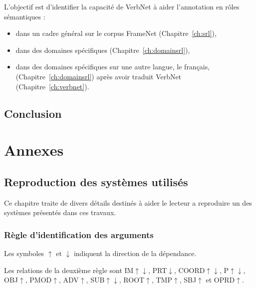 \documentclass[oneside,parskip,draft]{scrbook}
\begin{document}
L'objectif est d'identifier la capacité de VerbNet à aider l'annotation en
rôles sémantiques :
\begin{itemize}
    \item dans un cadre général sur le corpus FrameNet (Chapitre~\ref{ch:srl}),
    \item dans des domaines spécifiques (Chapitre~\ref{ch:domainsrl}),
    \item dans des domaines spécifiques sur une autre langue, le français, (Chapitre~\ref{ch:domainsrl}) après avoir traduit VerbNet (Chapitre~\ref{ch:verbnet}).
\end{itemize}









\chapter{Conclusion}
\label{ch:conc}


\backmatter




\part{Annexes}

\chapter{Reproduction des systèmes utilisés}

Ce chapitre traite de divers détails destinés à aider le lecteur a reproduire
un des systèmes présentés dans ces travaux.

\section{Règle d'identification des arguments}
\label{argument_identification}

Les symboles $\uparrow$ et $\downarrow$ indiquent la direction de la
dépendance.

Les relations de la deuxième règle sont IM$\uparrow\downarrow$,
PRT$\downarrow$, COORD$\uparrow\downarrow$, P$\uparrow\downarrow$,
OBJ$\uparrow$, PMOD$\uparrow$, ADV$\uparrow$, SUB$\uparrow\downarrow$,
ROOT$\uparrow$, TMP$\uparrow$, SBJ$\uparrow$ et OPRD$\uparrow$.
\end{document}
